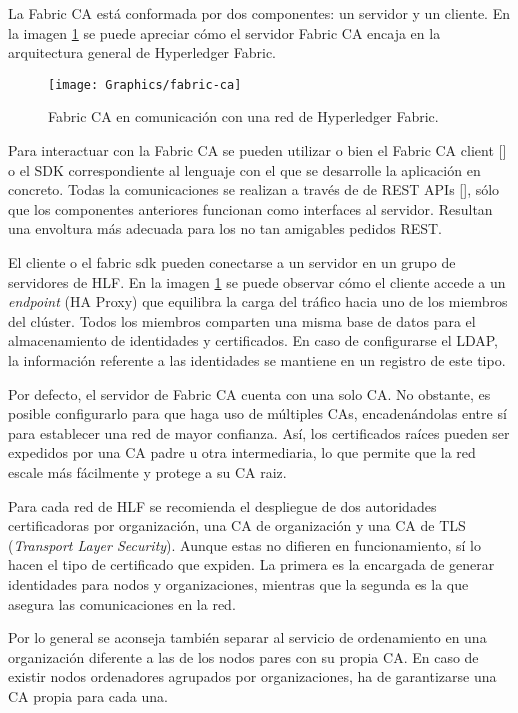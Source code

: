 La Fabric CA est\'a conformada por dos componentes: un servidor y un cliente. En la imagen \ref{fig:cadiagram} se puede apreciar c\'omo el servidor Fabric CA encaja en la arquitectura general de Hyperledger Fabric.

\begin{figure}[h]
	\centering
	\texttt{[image: Graphics/fabric-ca]}
	\caption{Fabric CA en comunicaci\'on con una red de Hyperledger Fabric.}
	\label{fig:cadiagram}
\end{figure}

Para interactuar con la Fabric CA se pueden utilizar o bien el Fabric CA client [\cite{caclient}] o el SDK correspondiente al lenguaje con el que se desarrolle la aplicaci\'on en concreto. Todas la comunicaciones se realizan a trav\'es de de REST APIs [\cite{restapifaclient}], s\'olo que los componentes anteriores funcionan como interfaces al servidor. Resultan una envoltura m\'as adecuada para los no tan amigables pedidos REST.

El cliente o el fabric sdk pueden conectarse a un servidor en un grupo de servidores de HLF. En la imagen \ref{fig:cadiagram} se puede observar c\'omo el cliente accede a un \emph{endpoint} (HA Proxy) que equilibra la carga del tr\'afico hacia uno de los miembros del cl\'uster. Todos los miembros comparten una misma base de datos para el almacenamiento de identidades y certificados. En caso de configurarse el LDAP, la informaci\'on referente a las identidades se mantiene en un registro de este tipo.

Por defecto, el servidor de Fabric CA cuenta con una solo CA. No obstante, es posible configurarlo para que haga uso de m\'ultiples CAs, encaden\'andolas entre s\'i para establecer una red de mayor confianza. As\'i, los certificados ra\'ices pueden ser expedidos por una CA padre u otra intermediaria, lo que permite que la red escale m\'as f\'acilmente y protege a su CA raiz.%

Para cada red de HLF se recomienda el despliegue de dos autoridades certificadoras por organizaci\'on, una CA de organizaci\'on y una CA de TLS (\emph{Transport Layer Security}). Aunque estas no difieren en funcionamiento, s\'i lo hacen el tipo de certificado que expiden. La primera es la encargada de generar identidades para nodos y organizaciones, mientras que la segunda es la que asegura las comunicaciones en la red.

Por lo general se aconseja tambi\'en separar al servicio de ordenamiento en una organizaci\'on diferente a las de los nodos pares con su propia CA. En caso de existir nodos ordenadores agrupados por organizaciones, ha de garantizarse una CA propia para cada una.

